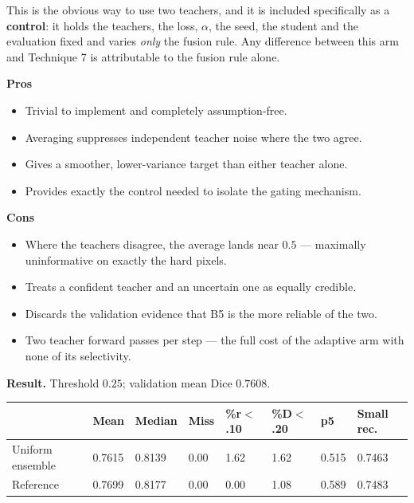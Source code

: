 \documentclass[11pt]{article}
\newcommand{\lose}[1]{\textcolor{losered}{#1}}
\newcommand{\pro}[1]{\item[\textcolor{proscol}{$+$}] #1}
\newcommand{\con}[1]{\item[\textcolor{conscol}{$-$}] #1}
\begin{document}
This is the obvious way to use two teachers, and it is included specifically as a
\textbf{control}: it holds the teachers, the loss, $\alpha$, the seed, the student and the
evaluation fixed and varies \emph{only} the fusion rule. Any difference between this arm and
Technique 7 is attributable to the fusion rule alone.

\begin{minipage}[t]{0.475\textwidth}
\textbf{\textcolor{proscol}{Pros}}
\begin{itemize}[leftmargin=1.5em,itemsep=1pt,label={},labelwidth=1em,labelsep=0.4em,align=left]
  \pro{Trivial to implement and completely assumption-free.}
  \pro{Averaging suppresses independent teacher noise where the two agree.}
  \pro{Gives a smoother, lower-variance target than either teacher alone.}
  \pro{Provides exactly the control needed to isolate the gating mechanism.}
\end{itemize}
\end{minipage}\hfill%
\begin{minipage}[t]{0.475\textwidth}
\textbf{\textcolor{conscol}{Cons}}
\begin{itemize}[leftmargin=1.5em,itemsep=1pt,label={},labelwidth=1em,labelsep=0.4em,align=left]
  \con{Where the teachers disagree, the average lands near $0.5$ --- maximally uninformative on
       exactly the hard pixels.}
  \con{Treats a confident teacher and an uncertain one as equally credible.}
  \con{Discards the validation evidence that B5 is the more reliable of the two.}
  \con{Two teacher forward passes per step --- the full cost of the adaptive arm with none of its
       selectivity.}
\end{itemize}
\end{minipage}

\vspace{6pt}
\textbf{Result.} Threshold $0.25$; validation mean Dice $0.7608$.

\begin{center}\small
\begin{tabular}{K q q q q q q M}
\toprule
& \textbf{Mean} & \textbf{Median} & \textbf{Miss} & \textbf{\%r$<$.10} & \textbf{\%D$<$.20} &
\textbf{p5} & \textbf{Small rec.} \\
\midrule
Uniform ensemble & 0.7615 & 0.8139 & 0.00 & 1.62 & 1.62 & \lose{0.515} & 0.7463 \\
Reference        & 0.7699 & 0.8177 & 0.00 & 0.00 & 1.08 & 0.589 & 0.7483 \\
\bottomrule
\end{tabular}
\end{center}
\end{document}
